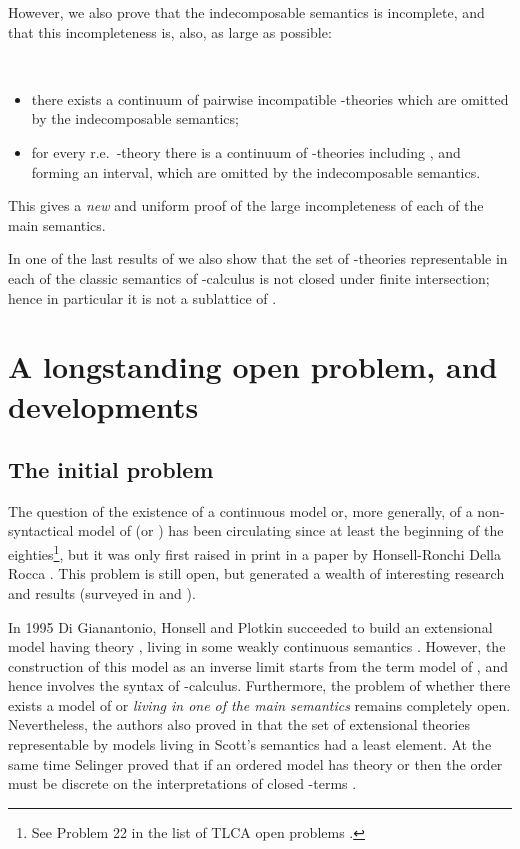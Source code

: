 \documentclass[english]{llncs}
\begin{document}
However, we also prove that the indecomposable semantics is incomplete, and that this incompleteness is, also, as large as possible: 
\begin{theorem} \cite[Thm.~4.4.16, Thm.~4.4.14]{ManzonettoTh} \
\begin{itemize}
\item[] there exists a continuum of pairwise incompatible -theories which are omitted by the indecomposable semantics;
\item [] for every r.e.\ -theory  there is a continuum of -theories 
               including , and forming an interval, which are omitted by the indecomposable semantics. 
\end{itemize}
\end{theorem}

This gives a \emph{new} and uniform proof of the large incompleteness of each of the main semantics.

In one of the last results of \cite[Chapter~4]{ManzonettoTh} we also show that the set of -theories 
representable in each of the classic semantics of -calculus is not closed under 
finite intersection; hence in particular it is not a sublattice of .





\section{A longstanding open problem, and developments}\label{sec:A longstanding open problem, and developments}

\subsection{The initial problem}

The question of the existence of a continuous model or, more generally, of a non-syntactical model of  (or ) 
has been circulating since at least the beginning of the eighties\footnote{See Problem 22 in the list of TLCA open problems \cite{HonsellTLCA}.}, 
but it was only first raised in print in a paper by Honsell-Ronchi Della Rocca \cite{HonsellR92}.
This problem is still open, but generated a wealth of interesting research and results (surveyed in \cite{Berline00} and \cite{Berline06}). 

In 1995 Di Gianantonio, Honsell and Plotkin succeeded to build an extensional model having theory , living in some 
weakly continuous semantics \cite{DiGianantonioHP95}. 
However, the construction of this model as an inverse limit starts from the term model of , and hence involves the 
syntax of -calculus. 
Furthermore, the problem of whether there exists a model of  or  {\em living in one of the main semantics} 
remains completely open. 
Nevertheless, the authors also proved in \cite{DiGianantonioHP95} that the set of extensional theories representable by models living in
Scott's semantics had a least element. 
At the same time Selinger proved that if an ordered model has theory  or  then the order must be discrete on the interpretations of closed -terms \cite{Selinger03}.
\end{document}

